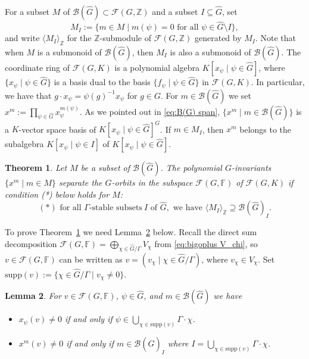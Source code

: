 \documentclass[12pt, oneside]{amsart}
\newtheorem{theorem}{\bf Theorem}[section]
\newtheorem{lemma}[theorem]{\bf Lemma}
\def\field{K}
\def\ZZ{\mathbb{Z}}
\def\FF{\mathbb{F}}
\begin{document}
For a subset $M$ of $\mathcal{B}(\widehat G)\subset \mathcal{F}(G,\ZZ)$ and a subset 
$I\subseteq\widehat G$, set 
\[M_I:=\{m\in M\mid m(\psi)=0\text{ for all }\psi\in\widehat G\setminus I\},\]
and write $\langle M_I\rangle_\ZZ$ for the $\ZZ$-submodule of $\mathcal{F}(G,\ZZ)$ 
generated by $M_I$. 
Note that when $M$ is a submonoid of $\mathcal{B}(\widehat G)$, then 
$M_I$ is also a submonoid of $\mathcal{B}(\widehat G)$. 
The coordinate ring of $\mathcal{F}(G,\field)$ is a polynomial algebra 
$\field[x_\psi\mid \psi\in \widehat G]$, where $\{x_\psi \mid \psi\in \widehat G\}$ is a basis 
dual to the basis $\{f_\psi\mid \psi\in \widehat G\}$ in $\mathcal{F}(G,\field)$. 
In particular, we have that $g\cdot x_\psi=\psi(g)^{-1}x_\psi$ for $g\in G$. 
For $m\in \mathcal{B}(\widehat G)$ we set 
$x^m:=\prod_{\psi\in \widehat G}x_\psi^{m(\psi)}$. 
As we pointed out in \eqref{eq:B(G) span}, $\{x^m\mid m\in \mathcal{B}(\widehat G)\}$ is a $\field$-vector space basis 
of $\field[x_\psi\mid \psi\in\widehat G]^G$. 
If $m\in M_I$, then $x^m$ belongs to the subalgebra $\field[x_\psi\mid \psi\in I]$ of 
$\field[x_\psi\mid \psi\in\widehat G]$. 

\begin{theorem}\label{thm:separating monomials} 
Let $M$ be a subset of $\mathcal{B}(\widehat G)$. The polynomial 
$G$-invariants $\{x^m\mid m\in M\}$ separate the $G$-orbits in the subspace 
$\mathcal{F}(G,\FF)$ of $\mathcal{F}(G,\field)$ if  condition (*) below holds for $M$: 
\[(*)\text{ for all }\Gamma\text{-stable subsets}\ I \text{ of }\widehat G, \text{ we have }
\langle M_I\rangle_\ZZ\supseteq \mathcal{B}(\widehat G)_I.\] 
\end{theorem}

To prove Theorem~\ref{thm:separating monomials} we need Lemma~\ref{lemma:x^m(v)=0} below. 
Recall the direct sum decomposition 
$\mathcal{F}(G,\FF)=\bigoplus_{\chi\in \widehat G/\Gamma} V_\chi$ from \eqref{eq:bigoplus V_chi}, 
so $v\in \mathcal{F}(G,\FF)$ can be written as 
$v=(v_\chi\mid \chi\in \widehat G/\Gamma)$, where $v_\chi\in V_\chi$. 
Set $\mathrm{supp}(v):=\{\chi\in \widehat G/\Gamma\mid v_\chi\neq 0\}$.   

\begin{lemma}\label{lemma:x^m(v)=0} 
For $v\in \mathcal{F}(G,\FF)$, $\psi\in \widehat G$, and $m\in \mathcal{B}(\widehat G)$ we have 
\begin{itemize} 
\item[(i)] $x_\psi(v)\neq 0$ if and only if $\psi\in \bigcup_{\chi\in \mathrm{supp}(v)}\Gamma\cdot\chi$. 
\item[(ii)] $x^m(v)\neq 0$ if and only if $m\in \mathcal{B}(\widehat G)_I$ where $I= \bigcup_{\chi\in \mathrm{supp}(v)}\Gamma\cdot\chi$. 
\end{itemize}
\end{lemma}
\end{document}
